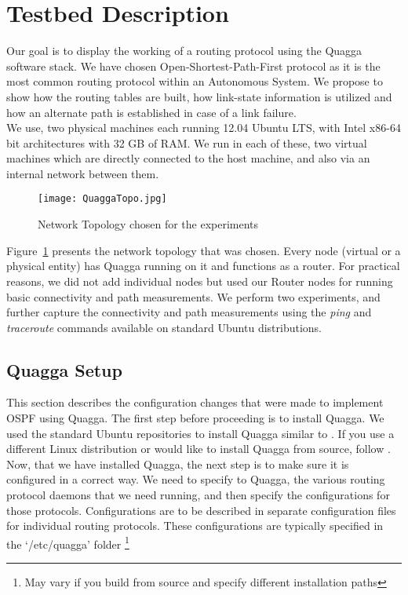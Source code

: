 \documentclass{article}
\begin{document}
\clearpage
\section{Testbed Description}
Our goal is to display the working of a routing protocol using the Quagga software stack.
We have chosen Open-Shortest-Path-First protocol as it is the most common routing protocol
within an Autonomous System. We propose to show how the routing tables are built, 
how link-state information is utilized and how an alternate path is established in case of a link failure.\\
We use, two physical machines each running 12.04 Ubuntu LTS, with Intel x86-64 bit architectures with
32 GB of RAM. We run in each of these, two virtual machines which are directly connected to the host machine,
and also via an internal network between them.\\
\begin{figure}[ht!]
  \centering
  \texttt{[image: QuaggaTopo.jpg]}
  \caption{Network Topology chosen for the experiments}
  \label{fig:networktopo}
\end{figure}
Figure~\ref{fig:networktopo} presents the network topology that was chosen. Every node (virtual or a physical
entity) has Quagga running on it and functions as a router. For practical reasons, we did not add individual nodes
but used our Router nodes for running basic connectivity and path measurements. We perform two experiments, and
further capture the connectivity and path measurements using the \textit{ping} and \textit{traceroute} commands 
available on standard Ubuntu distributions.
\subsection{Quagga Setup}
\label{sec:quaggasetup}
This section describes the configuration changes that were made to implement OSPF using Quagga.
The first step before proceeding is to install Quagga. We used the standard Ubuntu repositories to install Quagga similar to \cite{quaggaubuntuinstall}.
If you use a different Linux distribution or would like to install Quagga from source, follow \cite{quaggainstall}.\\
Now, that we have installed Quagga, the next step is to make sure it is configured in a correct way.
We need to specify to Quagga, the various routing protocol daemons that we need running, and 
then specify the configurations for those protocols. Configurations are to be described in separate configuration
files for individual routing protocols. These configurations are typically specified  in the `/etc/quagga' folder 
\footnote{May vary if you build from source and specify different installation paths}\\
\end{document}

